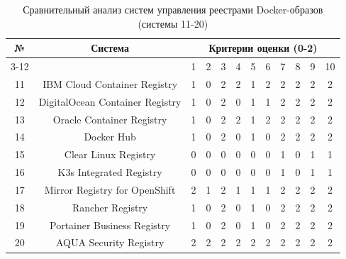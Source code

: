 \begin{table}[h!]
	\centering
	\caption{Сравнительный анализ систем управления реестрами Docker-образов (системы 11-20)}
	\label{table:comparison-2}
	\footnotesize
	\setlength{\tabcolsep}{2pt}
	\begin{tabular}{|c|c|cccccccccc|}
		\hline
		\multirow{2}{*}{№} & 
		\multirow{2}{*}{Система} & 
		\multicolumn{10}{c|}{Критерии оценки (0-2)} \\
		\cline{3-12}
		& & 1 & 2 & 3 & 4 & 5 & 6 & 7 & 8 & 9 & 10 \\
		\hline
		11 & IBM Cloud Container Registry & 1 & 0 & 2 & 2 & 1 & 2 & 2 & 2 & 2 & 2 \\
		12 & DigitalOcean Container Registry & 1 & 0 & 2 & 0 & 1 & 1 & 2 & 2 & 2 & 2 \\
		13 & Oracle Container Registry & 1 & 0 & 2 & 2 & 1 & 2 & 2 & 2 & 2 & 2 \\
		14 & Docker Hub & 1 & 0 & 2 & 0 & 1 & 0 & 2 & 2 & 2 & 2 \\
		15 & Clear Linux Registry & 0 & 0 & 0 & 0 & 0 & 0 & 1 & 0 & 1 & 1 \\
		16 & K3s Integrated Registry & 0 & 0 & 0 & 0 & 0 & 0 & 1 & 0 & 1 & 1 \\
		17 & Mirror Registry for OpenShift & 2 & 1 & 2 & 1 & 1 & 1 & 2 & 2 & 2 & 2 \\
		18 & Rancher Registry & 1 & 0 & 2 & 0 & 1 & 0 & 2 & 2 & 2 & 2 \\
		19 & Portainer Business Registry & 1 & 0 & 2 & 0 & 1 & 0 & 2 & 2 & 2 & 2 \\
		20 & AQUA Security Registry & 2 & 2 & 2 & 2 & 2 & 2 & 2 & 2 & 2 & 2 \\
		\hline
	\end{tabular}
\end{table}

\setcounter{table}{2}
\renewcommand{\thetable}{A.\arabic{table}}

